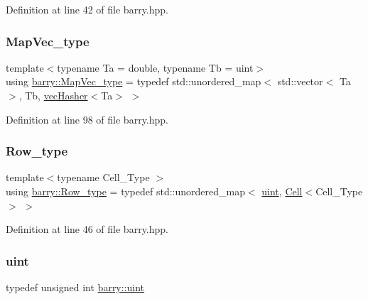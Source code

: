 Definition at line 42 of file barry.\+hpp.

\mbox{\label{namespacebarry_a2f0d3aab1d67e4c8eaeab9022e16139f}} 
\subsubsection{\texorpdfstring{Map\+Vec\+\_\+type}{MapVec\_type}}
{\footnotesize\ttfamily template$<$typename Ta  = double, typename Tb  = uint$>$ \\
using \hyperlink{namespacebarry_a2f0d3aab1d67e4c8eaeab9022e16139f}{barry\+::\+Map\+Vec\+\_\+type} = typedef std\+::unordered\+\_\+map$<$ std\+::vector$<$ Ta $>$, Tb, \hyperlink{structbarry_1_1vec_hasher}{vec\+Hasher}$<$Ta$>$ $>$}



Definition at line 98 of file barry.\+hpp.

\mbox{\label{namespacebarry_a8f67f2e1e26f3cb10d240b7e1a1d917c}} 
\subsubsection{\texorpdfstring{Row\+\_\+type}{Row\_type}}
{\footnotesize\ttfamily template$<$typename Cell\+\_\+\+Type $>$ \\
using \hyperlink{namespacebarry_a8f67f2e1e26f3cb10d240b7e1a1d917c}{barry\+::\+Row\+\_\+type} = typedef std\+::unordered\+\_\+map$<$ \hyperlink{namespacebarry_a11dfc53ddb4672278319aa04f1e09a6c}{uint}, \hyperlink{classbarry_1_1_cell}{Cell}$<$Cell\+\_\+\+Type$>$ $>$}



Definition at line 46 of file barry.\+hpp.

\mbox{\label{namespacebarry_a11dfc53ddb4672278319aa04f1e09a6c}} 
\subsubsection{\texorpdfstring{uint}{uint}}
{\footnotesize\ttfamily typedef unsigned int \hyperlink{namespacebarry_a11dfc53ddb4672278319aa04f1e09a6c}{barry\+::uint}}



